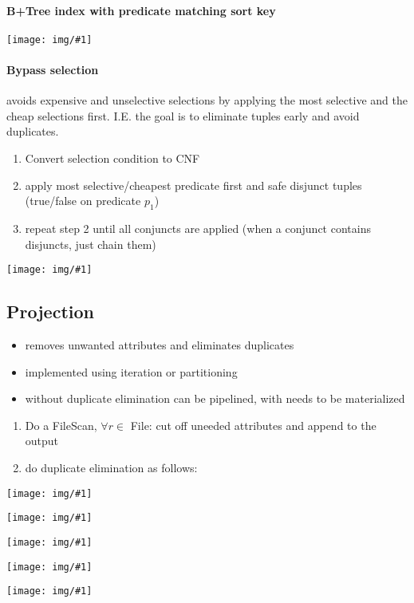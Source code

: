 \documentclass[a4paper]{article}
\newcommand{\img}[1]{\begin{center}
    \texttt{[image: img/\#1]}
\end{center} }
\begin{document}
\begin{twocolumn}
\paragraph{B+Tree index with predicate matching sort key}
\img{selection_btree}


\paragraph{Bypass selection} avoids expensive and unselective selections by applying the most selective and the cheap selections first. I.E. the goal is to eliminate tuples early and avoid duplicates.
\begin{enumerate}
	\item Convert selection condition to CNF
	\item apply most selective/cheapest predicate first and safe disjunct tuples (true/false on predicate $p_1$) 
	\item repeat step 2 until all conjuncts are applied (when a conjunct contains disjuncts, just chain them)
\end{enumerate}
\img{selection_bypass}


\subsection{Projection}
\begin{itemize}
	\item removes unwanted attributes and eliminates duplicates
	\item implemented using iteration or partitioning
	\item without duplicate elimination can be pipelined, with needs to be materialized
\end{itemize}
\begin{enumerate}
	\item Do a FileScan, $\forall r \in $ File: cut off uneeded attributes and append to the output
	\item do duplicate elimination as follows:
\end{enumerate}
\img{projection_sort}
\img{projection_sort_elim}
\img{projection_hash_p0}
\img{projection_hash_p0_g}
\img{projection_hash_p1}



\end{twocolumn}
\end{document}
